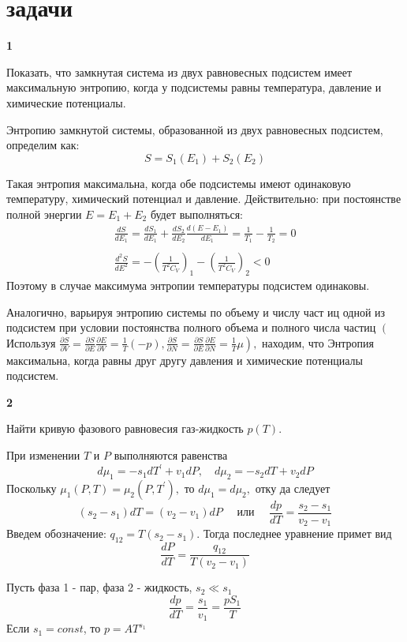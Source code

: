 \documentclass[a4paper,12pt]{article} %
\begin{document}
\clearpage
\part{задачи}



\begin{ttask}\textbf{1}


Показать, что замкнутая система из двух равновесных подсистем имеет максимальную энтропию, 
когда у подсистемы равны температура, давление и химические потенциалы.


Энтропию замкнутой системы, образованной из двух равновесных подсистем, определим как:
$$
S=S_{1}\left(E_{1}\right)+S_{2}\left(E_{2}\right)
$$


Такая энтропия максимальна, когда обе подсистемы имеют одинаковую температуру, химический потенциал и давление.
Действительно:
при постоянстве полной энергии $E=E_{1}+E_{2}$ будет выполняться:
{\Large $$
	\begin{array}{c}
	\frac{d S}{d E_{1}}=\frac{d S_{1}}{d E_{1}}+\frac{d S_{2}}{d E_{2}} \frac{d\left(E-E_{1}\right)}{d E_{1}}=\frac{1}{T_{1}}-\frac{1}{T_{2}}=0 \\ \\
	\frac{d^{2} S}{d E^{2}}=-\left(\frac{1}{T^{2} C_{V}}\right)_{1}-\left(\frac{1}{T^{2} C_{V}}\right)_{2}<0
	\end{array}
	$$}
Поэтому в случае максимума энтропии температуры подсистем одинаковы.

Аналогично, варьируя энтропию системы по объему и числу част иц одной из подсистем при условии постоянства полного объема и полного числа частиц 
$\left(\right.$ Используя $\left.\frac{\partial S}{\partial V}=
\frac{\partial S}{\partial E} \frac{\partial E}{\partial V}=\frac{1}{T}(-p), \frac{\partial S}{\partial N}=
\frac{\partial S}{\partial E} \frac{\partial E}{\partial N}=
\frac{1}{T} \mu\right),$ находим, что Энтропия
максимальна, когда равны друг другу давления и химические потенциалы подсистем.



\end{ttask}


\begin{ttask} \textbf{2}

Найти кривую фазового равновесия газ-жидкость $ p(T) $.


При изменении $T$ и $P$ выполняются равенства
$$
d \mu_{1}=-s_{1} d T^{\prime}+v_{1} d P, \quad d \mu_{2}=-s_{2} d T+v_{2} d P
$$
Поскольку $\mu_{1}(P, T)=\mu_{2}\left(P, T^{\prime}\right),$ то $d \mu_{1}=d \mu_{2},$ отку да следует
$$
\left(s_{2}-s_{1}\right) d T=\left(v_{2}-v_{1}\right) d P \quad \text { или } \quad \frac{d p}{d T}=\frac{s_{2}-s_{1}}{v_{2}-v_{1}}
$$
Введем обозначение: $q_{12}=T\left(s_{2}-s_{1}\right) .$ Тогда последнее уравнение примет вид
$$
\frac{d P}{d T}=
\frac{q_{12}}{T\left(v_{2}-v_{1}\right)}
$$


Пусть фаза 1 - пар, фаза 2 - жидкость, $ s_2 \ll s_1 $
\[ \frac{d p}{d T}=\frac{s_1}{v_1}=\frac{pS_1}{T} \]
Если $ s_1=const$, то $ p=AT^{s_1} $

\end{ttask}
\end{document}
